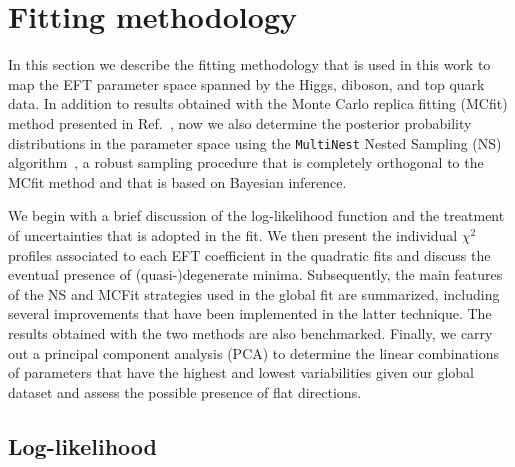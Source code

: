 \section{Fitting methodology}
\label{sec:fitsettings}

In this section we describe the fitting methodology that
is used in this work to map the EFT parameter space spanned by 
the Higgs, diboson, and top quark data.
%
In addition to results obtained with
the Monte Carlo replica fitting (MCfit) method
presented in Ref.~\cite{Hartland:2019bjb},
now we also determine the posterior probability 
distributions in the parameter space
using the {\tt MultiNest} Nested Sampling (NS) 
algorithm~\cite{Feroz:2013hea,Feroz:2007kg},
a robust sampling procedure that is completely orthogonal to
the MCfit method and that is based on Bayesian inference.

We begin with a brief discussion of the 
log-likelihood function and the treatment of uncertainties that is adopted
in the fit.
%
We then present the individual $\chi^2$ profiles associated to each
EFT coefficient in the quadratic fits
and discuss the eventual presence of (quasi-)degenerate minima.
%
Subsequently, the main features of the NS and MCFit strategies
used in the global fit are summarized, including 
several improvements that have been
implemented in the latter technique. The results obtained
with the two methods are also benchmarked.
%
Finally, we carry out a principal component analysis (PCA)
to determine the linear combinations of parameters that have
the highest and lowest variabilities
given our global dataset and
assess the possible presence of flat directions.

\subsection{Log-likelihood}
\label{sec:generalsettings}

